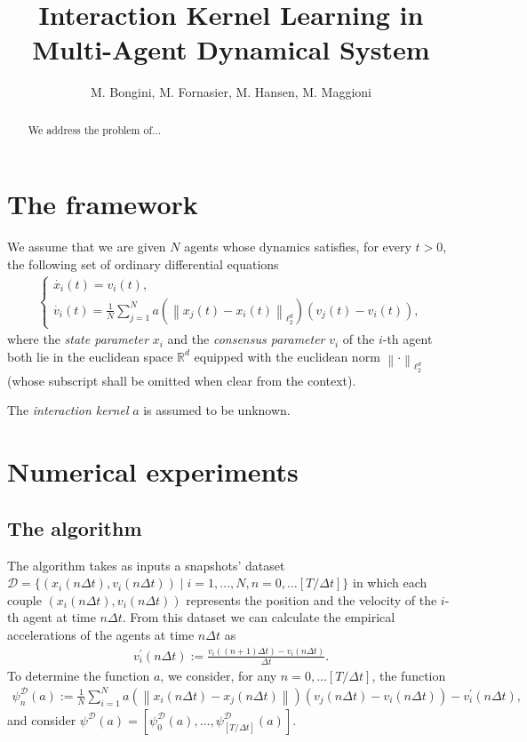 \documentclass[A4paper,11pt]{article}
\title{Interaction Kernel Learning in Multi-Agent Dynamical System}
\author{M. Bongini, M. Fornasier, M. Hansen, M. Maggioni}
\theoremstyle{definition}
\newcommand{\vnorm}[1]{\left\| #1 \right\|}
\begin{document}
\maketitle

\bigskip


\begin{abstract}
We address the problem of...
\end{abstract}

\section{The framework}

We assume that we are given $N$ agents whose dynamics satisfies, for every $t > 0$, the following set of ordinary differential equations
\begin{align*}
\begin{cases}
\dot{x_i}(t) = v_i(t), \\
\dot{v_i}(t) = \frac{1}{N}\sum^N_{j = 1} a(\vnorm{x_j(t) - x_i(t)}_{\ell^d_2})(v_j(t) - v_i(t)),
\end{cases}
\end{align*}
where the \emph{state parameter} $x_i$ and the \emph{consensus parameter} $v_i$ of the $i$-th agent both lie in the euclidean space $\mathbb{R}^d$ equipped with the euclidean norm $\vnorm{\cdot}_{\ell^d_2}$ (whose subscript shall be omitted when clear from the context).

The \emph{interaction kernel} $a$ is assumed to be unknown.

\section{Numerical experiments}

\subsection{The algorithm}

The algorithm takes as inputs a snapshots' dataset $\mathcal{D} = \{(x_i(n \Delta t), v_i(n \Delta t)) \mid i = 1, \ldots, N, n = 0, \ldots [T/\Delta t]\}$ in which each couple $(x_i(n \Delta t), v_i(n \Delta t))$ represents the position and the velocity of the $i$-th agent at time $n \Delta t$. From this dataset we can calculate the empirical accelerations of the agents at time $n \Delta t$ as
\begin{align*}
v^{\prime}_i(n \Delta t) := \frac{v_i((n+1)\Delta t) - v_i(n \Delta t)}{\Delta t}.
\end{align*}
To determine the function $a$, we consider, for any $n = 0, \ldots [T/\Delta t]$, the function
\begin{align*}
\psi^{\mathcal{D}}_n(a) := \frac{1}{N} \sum^N_{i = 1} a\left(\vnorm{x_i(n \Delta t) - x_j(n \Delta t)}\right)(v_j(n \Delta t) - v_i(n \Delta t)) - v^{\prime}_i(n \Delta t),
\end{align*}
and consider $\psi^{\mathcal{D}}(a) = \left[\psi^{\mathcal{D}}_0(a), \ldots, \psi^{\mathcal{D}}_{[T/\Delta t]}(a)\right]$.
\end{document}
